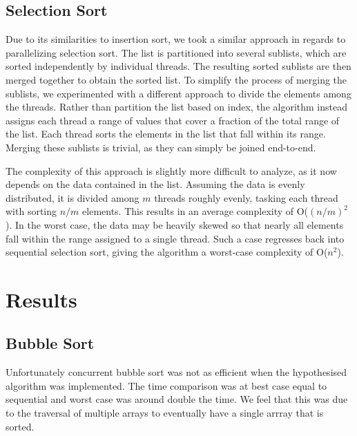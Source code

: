 \documentclass{article}
\begin{document}
\subsection{Selection Sort}
Due to its similarities to insertion sort, we took a similar approach in regards to parallelizing selection sort. The list is partitioned into several sublists, which are sorted independently by individual threads. The resulting sorted sublists are then merged together to obtain the sorted list. To simplify the process of merging the sublists, we experimented with a different approach to divide the elements among the threads. Rather than partition the list based on index, the algorithm instead assigns each thread a range of values that cover a fraction of the total range of the list. Each thread sorts the elements in the list that fall within its range. Merging these sublists is trivial, as they can simply be joined end-to-end.

The complexity of this approach is slightly more difficult to analyze, as it now depends on the data contained in the list. Assuming the data is evenly distributed, it is divided among $m$ threads roughly evenly, tasking each thread with sorting $n/m$ elements. This results in an average complexity of O($(n/m)^2$). In the worst case, the data may be heavily skewed so that nearly all elements fall within the range assigned to a single thread. Such a case regresses back into sequential selection sort, giving the algorithm a worst-case complexity of O($n^2$).

\section{Results}
\subsection{Bubble Sort}
Unfortunately concurrent bubble sort was not as efficient when the hypothesised algorithm was implemented. The time comparison was at best case equal to sequential and worst case was around double the time. We feel that this was due to the traversal of multiple arrays to eventually have a single arrray that is sorted.
\end{document}
